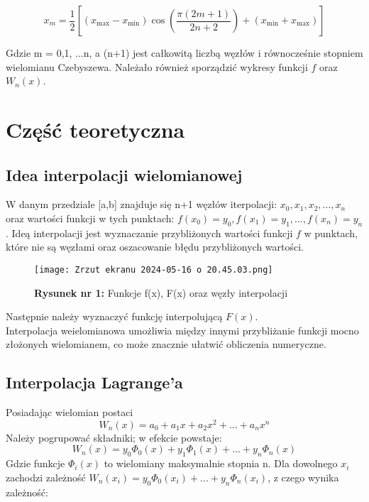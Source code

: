 \documentclass{article}
\begin{document}
\begin{equation*}
x_m = \frac{1}{2} \left[ (x_{\text{max}} - x_{\text{min}}) \cos\left(\frac{\pi (2m+1)}{2n+2}\right) + (x_{\text{min}} + x_{\text{max}}) \right]
\end{equation*}

\noindent
Gdzie m = 0,1, ...n, a (n+1) jest całkowitą liczbą węzłów i równocześnie stopniem wielomianu Czebyszewa. Należało również sporządzić wykresy funkcji $f$ oraz $W_n(x)$.

\section{Część teoretyczna}

\subsection{Idea interpolacji wielomianowej}

W danym przedziale [a,b] znajduje się n+1 węzłów iterpolacji: $x_0, x_1, x_2, ..., x_n$ oraz wartości funkcji w tych punktach: $f(x_0) = y_0, f(x_1) = y_1, ..., f(x_n) = y_n$. Ideą interpolacji jest wyznaczanie przybliżonych wartości funkcji $f$ w punktach, które nie są węzłami oraz oszacowanie błędu przybliżonych wartości.

\begin{figure}[H]
    \centering
    \texttt{[image: Zrzut ekranu 2024-05-16 o 20.45.03.png]}
    \caption{\textbf{Rysunek nr 1:} Funkcje f(x), F(x) oraz węzły interpolacji}
    \label{fig:enter-label}
\end{figure}

\noindent
Następnie należy wyznaczyć funkcję interpolującą $F(x)$. \\
Interpolacja weielomianowa umożliwia między innymi przybliżanie funkcji mocno złożonych wielomianem, co może znacznie ułatwić obliczenia numeryczne. 

\subsection{Interpolacja Lagrange'a}
Posiadając wielomian postaci
\begin{equation*}
    W_n(x) = a_0 + a_1x + a_2x^2 + ... + a_nx^n
\end{equation*}
Należy pogrupować składniki; w efekcie powstaje:
\begin{equation*}
    W_n(x) = y_0\Phi_0(x) + y_1\Phi_1(x) + ... + y_n\Phi_n(x)
\end{equation*}
Gdzie funkcje $\Phi_i(x)$ to wielomiany maksymalnie stopnia n. Dla dowolnego $x_i$ zachodzi zależność $W_n(x_i) = y_0\Phi_0(x_i) + ... + y_n\Phi_n(x_i)$, z czego wynika zależność:
\end{document}
